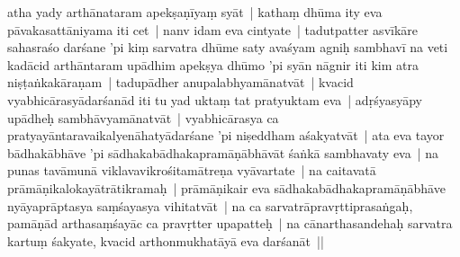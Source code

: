\documentclass[article,12pt,a4paper]{memoir}%
\newcounter{parCount}
\begin{document}
	  \pstart \leavevmode%
	\label{thakur75-47.11}atha \label{ratnakīrtinibandhāvali__36r1PF7IMVK24238RM491U9AF0B}yady arthā\label{ratnakīrtinibandhāvali__36r1PF7IMVJ82PKM5MV8I8FCZI0}nataram apekṣaṇīyaṃ syāt | \label{sarit__ratnakīrtinibandhāvali__126671}kathaṃ dhūma ity eva pāvakasattāniyama iti cet | nanv idam eva cintyate | tadutpatter asvīkāre sahasraśo darśane 'pi kiṃ sarvatra dhūme saty avaśyam agniḥ sambhavī na veti\label{sarit__ratnakīrtinibandhāvali__126898} kadācid arthāntaram upādhim apekṣya dhūmo 'pi syān nāgnir iti kim atra niṣṭaṅkakāraṇam | tadupādher anupalabhyamānatvāt | kvacid vyabhicārasyādarśanād iti tu yad uktaṃ tat pratyuktam eva | adṛśyasyāpy upādheḥ sambhāvyamānatvāt | vyabhicārasya ca pratyayāntaravaikalyenāhatyādarśane 'pi niṣeddham aśakyatvāt | ata eva tayor bādhakābhāve 'pi sādhakabādhakapramāṇābhāvāt śaṅkā sambhavaty eva | na punas tavāmunā viklavavikrośitamātreṇa vyāvartate | na caitavatā prāmāṇikalokayātrātikramaḥ | prāmāṇikair eva sādhakabādhakapramāṇābhāve nyāyaprāptasya saṃśayasya vihitatvāt | na ca sarvatrāpravṛttiprasaṅgaḥ, pamāṇād arthasaṃśayāc ca pravṛtter upapatteḥ | na cānarthasandehaḥ sarvatra kartuṃ śakyate, kvacid arthonmukhatāyā eva darśanāt ||
	{}
	\pend%
      
\end{document}

